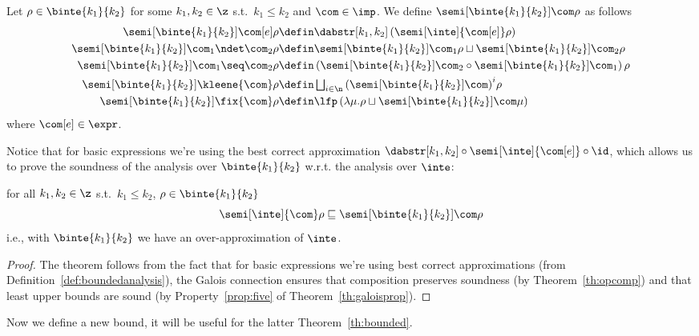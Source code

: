 \begin{definition}\label{def:boundedanalysis}
  Let \(\rho \in \binte{k_1}{k_2}\) for some \(k_1, k_2 \in \z\) s.t.\
  \(k_1 \leq k_2\) and \(\com \in \imp\). We define
  \(\semi[\binte{k_1}{k_2}]{\com}\rho\) as follows
  \begin{align*}
    \semi[\binte{k_1}{k_2}]{\com[e]}\rho & \defin \dabstr[k_1,k_2] \left(\semi[\inte]{\com[e]}\rho\right) \\
    \semi[\binte{k_1}{k_2}]{\com_1 \ndet \com_2}\rho & \defin \semi[\binte{k_1}{k_2}]{\com_1}\rho \sqcup \semi[\binte{k_1}{k_2}]{\com_2}\rho \\
    \semi[\binte{k_1}{k_2}]{\com_1 \seq \com_2}\rho & \defin \left(\semi[\binte{k_1}{k_2}]{\com_2} \circ \semi[\binte{k_1}{k_2}]{\com_1}\right)\rho \\
    \semi[\binte{k_1}{k_2}]{\kleene{\com}}\rho & \defin \textstyle\bigsqcup_{i\in\n}{\left({\semi[\binte{k_1}{k_2}]{\com}}\right)}^i\rho \\
    \semi[\binte{k_1}{k_2}]{\fix{\com}}\rho & \defin \lfp\left(\lambda \mu . \rho \sqcup \semi[\binte{k_1}{k_2}]{\com}\mu\right)
  \end{align*}
  where \(\com[e]\in\expr\). 
\end{definition}
\noindent
Notice that for basic expressions we're using the best correct
approximation
\(\dabstr[k_1,k_2] \circ \semi[\inte]{\com[e]} \circ \id\), which
allows us to prove the soundness of the analysis over
\(\binte{k_1}{k_2}\) w.r.t. the analysis over \(\inte\):
\begin{lemma}\label{le:leq}
  for all \(k_1, k_2\in\z\) s.t.\ \(k_1 \leq k_2\),
  \(\rho \in \binte{k_1}{k_2}\)
  \begin{equation*}
    \semi[\inte]{\com}\rho \sqsubseteq \semi[\binte{k_1}{k_2}]{\com}\rho
  \end{equation*}
  i.e., with \(\binte{k_1}{k_2}\) we have an over-approximation of \(\inte\).
\end{lemma}

\begin{proof}
  The theorem follows from the fact that for basic expressions we're
  using best correct approximations (from
  Definition~\ref{def:boundedanalysis}), the Galois connection ensures
  that composition preserves soundness (by Theorem~\ref{th:opcomp})
  and that least upper bounds are sound (by Property~\ref{prop:five}
  of Theorem~\ref{th:galoisprop}).
\end{proof}

Now we define a new bound, it will be useful for the latter
Theorem~\ref{th:bounded}.

